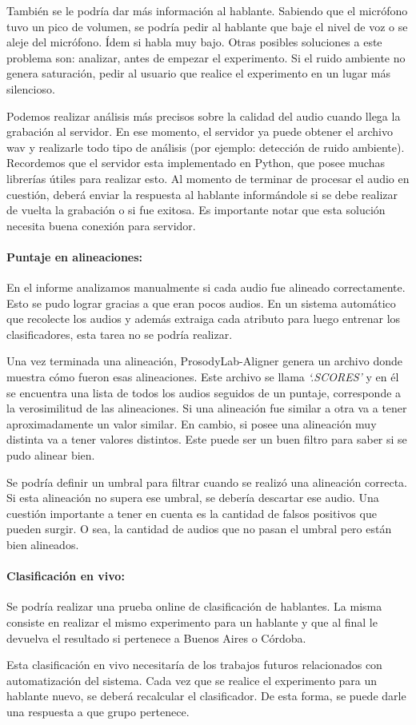 También se le podría dar más información al hablante. Sabiendo que el micrófono tuvo un pico de volumen, se podría pedir al hablante que baje el nivel de voz o se aleje del micrófono. Ídem si habla muy bajo. Otras posibles soluciones a este problema son: analizar, antes de empezar el experimento. Si el ruido ambiente no genera saturación, pedir al usuario que realice el experimento en un lugar más silencioso. 

Podemos realizar análisis más precisos sobre la calidad del audio cuando llega la grabación al servidor. En ese momento, el servidor ya puede obtener el archivo wav y realizarle todo tipo de análisis (por ejemplo: detección de ruido ambiente). Recordemos que el servidor esta implementado en Python, que posee muchas librerías útiles para realizar esto. Al momento de terminar de procesar el audio en cuestión, deberá enviar la respuesta al hablante informándole si se debe realizar de vuelta la grabación o si fue exitosa. Es importante notar que esta solución necesita buena conexión para servidor. 

\paragraph*{Puntaje en alineaciones:} En el informe analizamos manualmente si cada audio fue alineado correctamente. Esto se pudo lograr gracias a que eran pocos audios. En un sistema automático que recolecte los audios y además extraiga cada atributo para luego entrenar los clasificadores, esta tarea no se podría realizar.     

Una vez terminada una alineación, ProsodyLab-Aligner genera un archivo donde muestra cómo fueron esas alineaciones. Este archivo se llama \textit{`.SCORES’} y en él se encuentra una lista de todos los audios seguidos de un puntaje, corresponde a la verosimilitud de las alineaciones. Si una alineación fue similar a otra va a tener aproximadamente un valor similar. En cambio, si posee una alineación muy distinta va a tener valores distintos. Este puede ser un buen filtro para saber si se pudo alinear bien.

Se podría definir un umbral para filtrar cuando se realizó una alineación correcta. Si esta alineación no supera ese umbral, se debería descartar ese audio. Una cuestión importante a tener en cuenta es la cantidad de falsos positivos que pueden surgir. O sea, la cantidad de audios que no pasan el umbral pero están bien alineados.   

\paragraph*{Clasificación en vivo:} Se podría realizar una prueba online de clasificación de hablantes. La misma consiste en realizar el mismo experimento para un hablante y que al final le devuelva el resultado si pertenece a Buenos Aires o Córdoba.

Esta clasificación en vivo necesitaría de los trabajos futuros relacionados con automatización del sistema. Cada vez que se realice el experimento para un hablante nuevo, se deberá recalcular el clasificador. De esta forma, se puede darle una respuesta a que grupo pertenece.